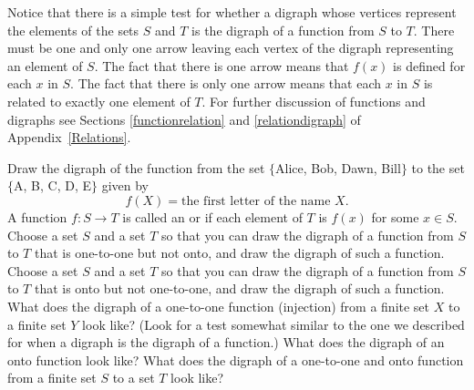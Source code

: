 Notice that there is a simple test for whether a digraph whose vertices
represent the elements of the sets $S$ and $T$ is the digraph of a function
from $S$ to $T$.  There must be one and only one arrow leaving each vertex of
the digraph representing an element of $S$.  The fact that there is one arrow
means that $f(x)$ is defined for each $x$ in $S$.  The fact that there is
only one arrow means that each $x$ in $S$ is related to exactly one element of
$T$.  For further discussion of functions and digraphs see Sections
\ref{functionrelation} and \ref{relationdigraph} of {Appendix~\ref{Relations}}.

\bp
\itemm Draw the digraph of the function from the set $\{$Alice, Bob, Dawn,
Bill$\}$ to the set $\{$A, B, C, D, E$\}$ given by $$f(X) = \mbox{the first
letter of the name $X$}.$$ 
\iteme A function
$f:S\rightarrow T$ is called an
 or
 if each
element of
$T$ is $f(x)$ for some $x\in S$.  Choose a set $S$ and a set $T$ so that you
can draw the digraph of a function from $S$ to $T$ that is one-to-one but not
onto, and draw the digraph of such a function.
\itemm Choose a set $S$ and a set $T$ so that you can draw the digraph of a
function from $S$ to $T$ that is onto but not one-to-one, and draw the
digraph of such a function.
\iteme What does the digraph of a one-to-one function
(injection) from a finite set $X$ to a finite set $Y$ look
like? (Look for a test somewhat similar to the one we  described for
when a digraph is the digraph of a function.)  What does the digraph of an
onto function look like?  What does the digraph of a one-to-one and onto 
function  from a finite set
$S$ to a set
$T$ look like? \label{bijectiondigraph}


